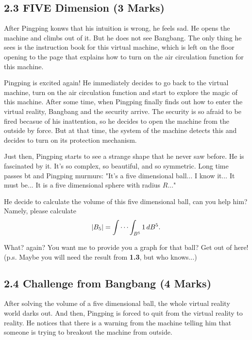 \documentclass[12pt]{article}
\begin{document}
\subsection*{2.3 FIVE Dimension (3 Marks)}
\par After Pingping konws that his intuition is wrong, he feels sad. He opens the machine and climbs out of it. But 
he does not see Bangbang. The only thing he sees is the instruction book for this virtual machine, which is left 
on the floor opening to the page that explains how to turn on the air circulation function for this machine. 

\par Pingping is excited again! He immediately decides to go back to the virtual machine, turn on the air 
circulation function and start to explore the magic of this machine. After some time, when Pingping finally 
finds out how to enter the virtual reality, Bangbang and the security arrive. The security is so afraid to be 
fired becasue of his inattention, so he decides to open the machine from the outside by force. But at that time,
the system of the machine detects this and decides to turn on its protection mechanism. 

\par Just then, Pingping starts to see a strange shape that he never saw before. He is fascinated by it. It's so 
complex, so beautiful, and so symmetric. Long time passes bt and Pingping murmurs: "It's a five dimensional ball... I 
know it... It must be... It is a five dimensional sphere with radius $R$..."

\par He decide to calculate the volume of this five dimensional ball, can you help him? Namely, please calculate 
\begin{equation*}
    \abs{B_5} = \idotsint_{B^5}1 \,dB^5. 
\end{equation*}

\par What? again? You want me to provide you a graph for that ball? Get out of here!\\
\hfill (p.s. Maybe you will need the result from \textbf{1.3}, but who knows...)

\subsection*{2.4 Challenge from Bangbang (4 Marks)}
\par After solving the volume of a five dimensional ball, the whole virtual reality world darks out. And then, 
Pingping is forced to quit from the virtual reality to reality. He notices that there is a warning from the machine 
telling him that someone is trying to breakout the machine from outside. 
\end{document}
